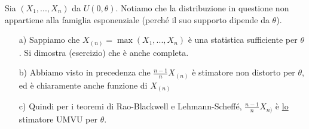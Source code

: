 \begin{esempio}
Sia $(X_1,...,X_n)$ da $U(0,\theta)$. Notiamo che la distribuzione in questione non appartiene alla famiglia esponenziale (perché il suo supporto dipende da $\theta$).
\begin{enumerate}
\item[a)] Sappiamo che $X_{(n)}=\max(X_1,...,X_n)$ è una statistica sufficiente per $\theta$. Si dimostra (esercizio) che è anche completa.
\item[b)] Abbiamo visto in precedenza che $\frac{n-1}{n}X_{(n)}$ è stimatore non distorto per $\theta$, ed è chiaramente anche funzione di $X_{(n)}$
\item[c)] Quindi per i teoremi di Rao-Blackwell e Lehmann-Scheffé, $\frac{n-1}{n} X_{n)}$ è \underline{lo} stimatore UMVU per $\theta$.
\\
\\
\end{enumerate}
\end{esempio}
